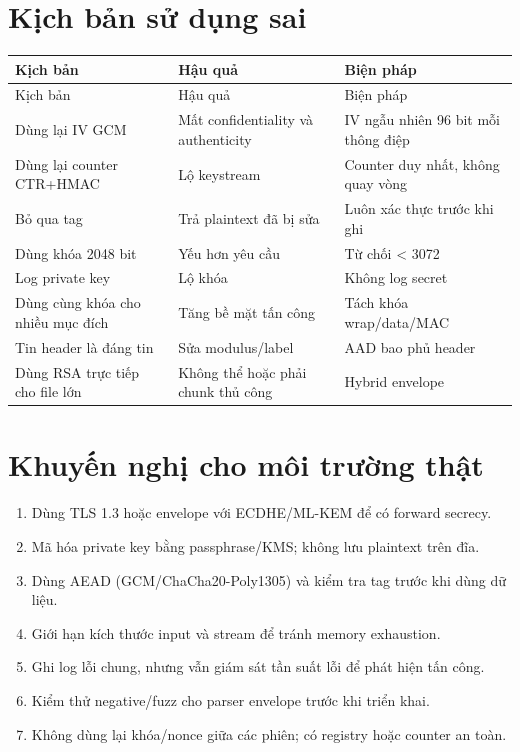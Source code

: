 \documentclass[12pt,a4paper,oneside]{report}
\begin{document}
\section{Kịch bản sử dụng sai}


\begin{longtable}{p{}p{}p{}}
\toprule
Kịch bản & Hậu quả & Biện pháp \\
\midrule
\endfirsthead
\toprule
Kịch bản & Hậu quả & Biện pháp \\
\midrule
\endhead
Dùng lại IV GCM & Mất confidentiality và authenticity & IV ngẫu nhiên 96 bit mỗi thông điệp \\
Dùng lại counter CTR+HMAC & Lộ keystream & Counter duy nhất, không quay vòng \\
Bỏ qua tag & Trả plaintext đã bị sửa & Luôn xác thực trước khi ghi \\
Dùng khóa 2048 bit & Yếu hơn yêu cầu & Từ chối < 3072 \\
Log private key & Lộ khóa & Không log secret \\
Dùng cùng khóa cho nhiều mục đích & Tăng bề mặt tấn công & Tách khóa wrap/data/MAC \\
Tin header là đáng tin & Sửa modulus/label & AAD bao phủ header \\
Dùng RSA trực tiếp cho file lớn & Không thể hoặc phải chunk thủ công & Hybrid envelope \\
\bottomrule
\end{longtable}


\section{Khuyến nghị cho môi trường thật}


\begin{enumerate}[leftmargin=*]
\item Dùng TLS 1.3 hoặc envelope với ECDHE/ML-KEM để có forward secrecy.
\item Mã hóa private key bằng passphrase/KMS; không lưu plaintext trên đĩa.
\item Dùng AEAD (GCM/ChaCha20-Poly1305) và kiểm tra tag trước khi dùng dữ liệu.
\item Giới hạn kích thước input và stream để tránh memory exhaustion.
\item Ghi log lỗi chung, nhưng vẫn giám sát tần suất lỗi để phát hiện tấn công.
\item Kiểm thử negative/fuzz cho parser envelope trước khi triển khai.
\item Không dùng lại khóa/nonce giữa các phiên; có registry hoặc counter an toàn.
\end{enumerate}
\end{document}
